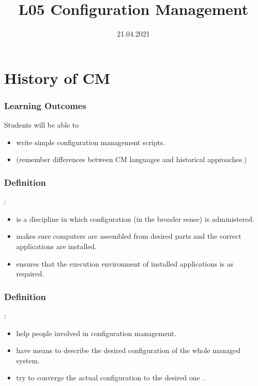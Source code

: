 

\title{L05 Configuration Management}
\date{21.04.2021}




\section{History of CM}

\begin{frame}
	\frametitle{Learning Outcomes}
	Students will be able to
	\begin{itemize}
	\item write simple configuration management scripts.
	\item (remember differences between CM languages and historical approaches.)
	\end{itemize}
\end{frame}

\begin{frame}
	\frametitle{Definition}

	:

	\begin{itemize}
	\item is a discipline in which configuration (in the broader sense) is administered.
	\item makes sure computers are assembled from desired parts and the correct applications are installed.
	\item ensures that the execution environment of installed applications is as required.
	\end{itemize}
\end{frame}


\begin{frame}
	\frametitle{Definition}

	:

	\pause

	\begin{itemize}
	\item help people involved in configuration management.
	\item have means to describe the desired configuration of the whole managed system.
	\item try to converge the actual configuration to the desired one~\cite{burgess1995cfengine}.
	\end{itemize}
\end{frame}



